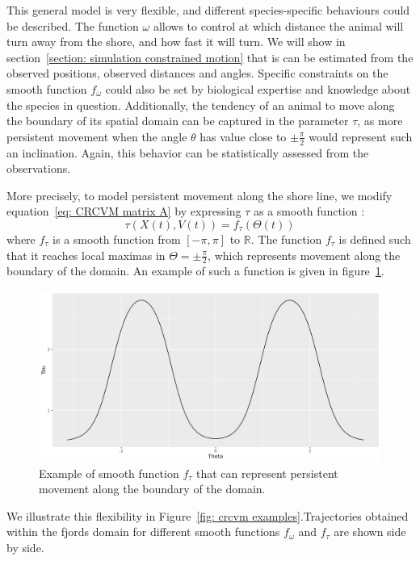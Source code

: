 \documentclass[11pt]{article}
\newcommand {\R}{\mathbb{R}}
\newcommand {\1}{\mathbb{1}}
\theoremstyle{definition}
\theoremstyle{remark}
\theoremstyle{remark}
\begin{document}
 This general model is very flexible, and different species-specific behaviours could be described. The function $\omega$ allows to control at which distance the animal will turn away from the shore, and how fast it will turn. We will show in section~\ref{section: simulation constrained motion} that is can be estimated from the observed positions, observed distances and angles. Specific constraints on the smooth function $f_{\omega}$ could also be set by biological expertise and knowledge about the species in question. Additionally, the tendency of an animal to move along the boundary of its spatial domain can be captured in the parameter $\tau$, as more persistent movement when the angle $\theta$ has value close to $\pm\frac{\pi}{2}$ would represent such an inclination. Again, this behavior can be statistically assessed from the observations. 
 
 More precisely, to model persistent movement along the shore line, we modify equation~\ref{eq: CRCVM matrix A} by expressing $\tau$ as a smooth function :
 \[\tau(X(t),V(t))=f_{\tau}(\Theta(t))\] where $f_{\tau}$ is a smooth function from $[-\pi,\pi]$ to $\R$.
 The function $f_{\tau}$ is defined such that it reaches local maximas in $\Theta=\pm\frac{\pi}{2}$, which represents movement along the boundary of the domain. An example of such a function is given in figure~\ref{fig:smoothtaubump}.
 \begin{figure}[H]
 	\centering
 	\includegraphics[scale=0.3]{images/crcvm/smooth_tau_bump}
 	\caption{Example of smooth function $f_{\tau}$ that can represent persistent movement along the boundary of the domain.}
 	\label{fig:smoothtaubump}
 \end{figure}
 
 We illustrate this flexibility in Figure~\ref{fig: crcvm examples}.Trajectories obtained within the fjords domain for different smooth functions $f_{\omega}$ and $f_{\tau}$ are shown side by side.
 
\end{document}
